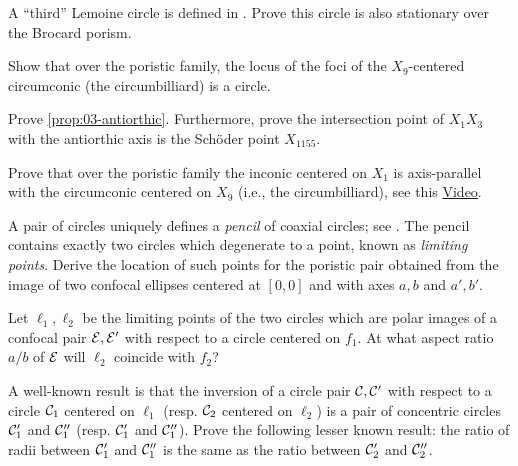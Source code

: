 \begin{exercise}
A ``third'' Lemoine circle  is defined in \cite{darij2012-ehrmann}. Prove this circle is also stationary over the Brocard porism. 
\end{exercise}

\begin{exercise}
Show that over the poristic family, the locus of the foci of the $X_9$-centered circumconic (the circumbilliard) is a circle.
\end{exercise}

\begin{exercise}
Prove \cref{prop:03-antiorthic}. Furthermore, prove the intersection point of $X_1 X_3$ with the antiorthic axis is the Schöder point $X_{1155}$.
\end{exercise}

\begin{exercise}
Prove that over the poristic family the inconic centered on $X_1$ is axis-parallel with the circumconic centered on $X_9$ (i.e., the circumbilliard), see this \href{https://youtu.be/0VHBjdHXbJc}{Video}.
\end{exercise}

\begin{exercise}
A pair of circles uniquely defines a {\em pencil} of coaxial circles; see \cite[Limiting Points]{mw}. The pencil contains exactly two circles which degenerate to a point, known as {\em limiting points}. Derive the location of such points for the poristic pair obtained from the image of two confocal ellipses centered at $[0,0]$ and with axes $a,b$ and $a',b'$.
\end{exercise}

\begin{exercise}
Let $\ell_1,\ell_2$ be the limiting points of the two circles which are polar images of a confocal pair $\mathcal{E},\mathcal{E}'$ with respect to a circle centered on $f_1$. At what aspect ratio $a/b$ of $\mathcal{E}$ will $\ell_2$ coincide with $f_2$?
\end{exercise}

\begin{exercise}
A well-known result is that the inversion of a circle pair $\mathcal{C},\mathcal{C}'$ with respect to a circle $\mathcal{C}_1$ centered on $\ell_1$ (resp. $\mathcal{C}_2$ centered on $\ell_2$) is a pair of concentric circles $\mathcal{C}_1'$ and $\mathcal{C}_1''$ (resp. $\mathcal{C}_1'$ and $\mathcal{C}_1''$). Prove the following lesser known result: the ratio of radii between $\mathcal{C}_1'$ and $\mathcal{C}_1''$ is the same as the ratio between $\mathcal{C}_2'$ and $\mathcal{C}_2''$. 
\end{exercise}

